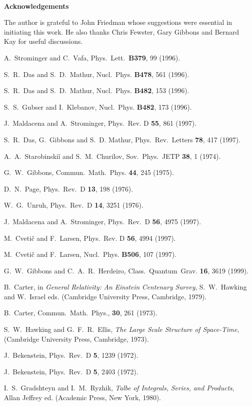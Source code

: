 \documentclass[a4paper,12pt]{article}
\begin{document}
\

\begin{flushleft}
{\large {\bf Acknowledgements}}
\end{flushleft}

The author is grateful to John Friedman whose suggestions were essential
in initiating this work.  He also thanks Chris Fewster, Gary Gibbons
and Bernard Kay for useful discussions.

\begin{thebibliography}{99}

 A.\ Strominger and C.\ Vafa, Phys.\ Lett.\ {\bf B379}, 99 (1996).

 S.\ R.\ Das and S.\ D.\ Mathur, Nucl.\ Phys. {\bf B478}, 561
(1996).

 S.\ R.\ Das and S.\ D.\ Mathur, Nucl.\ Phys. {\bf B482}, 153
(1996).

 S.\ S.\ Gubser and I.\ Klebanov, Nucl.\ Phys. {\bf B482}, 173
(1996).

 J.\ Maldacena and A.\ Strominger, Phys.\ Rev. D {\bf 55}, 861
(1997).

S.\ R.\ Das, G.\ Gibbons and S.\ D. Mathur, Phys.\ Rev.\ Letters {\bf 78},
417 (1997).
 
 A.\ A.\ Starobinski\v{i} and S.\ M.\ Churilov, Sov.\ Phys.\ 
JETP {\bf 38}, 1 (1974).

 G.\ W.\ Gibbons, Commun.\ Math.\ Phys. {\bf 44}, 245 (1975).

 D.\ N.\ Page, Phys.\ Rev.\ D {\bf 13}, 198 (1976).

 W.\ G.\ Unruh, Phys.\ Rev.\ D {\bf 14}, 3251 (1976).

 J.\ Maldacena and A.\ Strominger, Phys.\ Rev.\ D {\bf 56},
4975 (1997).

 M.\ Cveti\v{c} and F.\ Larsen, Phys.\ Rev. D {\bf 56}, 
4994 (1997).

 M.\ Cveti\v{c} and F.\ Larsen, Nucl.\ Phys. {\bf B506}, 
107 (1997).

 G.\ W.\ Gibbons and C.\ A.\ R.\ Herdeiro, Class.\ Quantum\ Grav.
{\bf 16}, 3619 (1999).

B.\ Carter, in {\it General Relativity: An Einstein Centenary Survey},
S.\ W.\ Hawking and W.\ Israel eds. (Cambridge University Press, Cambridge,
1979).

 B.\ Carter, Commun.\ Math.\ Phys., {\bf 30}, 261 (1973).

S.\ W.\ Hawking and G.\ F.\ R.\ Ellis, {\it The Large Scale Structure of
Space-Time}, 
(Cambridge University Press, Cambridge, 1973).

 J.\ Bekenstein, Phys.\ Rev.\ D {\bf 5}, 1239 (1972).

 J.\ Bekenstein, Phys.\ Rev.\ D {\bf 5}, 2403 (1972).

 I.\ S.\ Gradshteyn and I.\ M.\ Ryzhik, {\it Talbe of Integrals,
Series, and Products}, Allan Jeffrey ed. (Academic Press, New York, 1980).

\end{thebibliography}
\end{document}
